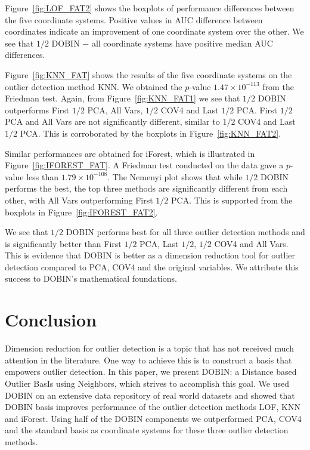 \documentclass[letter,12pt]{article}
\begin{document}
Figure~\ref{fig:LOF_FAT2} shows the boxplots of performance differences between the {\color{blue} five } coordinate systems. Positive values in AUC difference between coordinates  indicate an improvement of one coordinate system over the other. We see that $1/2$ DOBIN $-$ {\color{blue} all coordinate systems have positive median AUC differences}. 

Figure~\ref{fig:KNN_FAT} shows the results of the {\color{blue} five } coordinate systems on the outlier detection method KNN. We obtained the $p$-value $1.47\times 10^{-113}$ from the Friedman test. Again, from Figure~\ref{fig:KNN_FAT1} we see that $1/2$ DOBIN outperforms {\color{blue} First $1/2$ PCA,  All Vars, $1/2$ COV4 and Last $1/2$ PCA. First $1/2$ PCA and All Vars are not significantly different, similar to $1/2$ COV4 and Last $1/2$ PCA. }
This is corroborated by the boxplots in Figure~\ref{fig:KNN_FAT2}. %

Similar performances are obtained for iForest, which is illustrated in Figure~\ref{fig:IFOREST_FAT}. A Friedman test conducted on the data gave a $p$-value less than $1.79 \times 10^{-108}$. The Nemenyi plot shows that while $1/2$ DOBIN performs the best, {\color{blue} the top} three methods are significantly different from each other, with All Vars outperforming First $1/2$ PCA.  This is supported from the boxplots in Figure~\ref{fig:IFOREST_FAT2}. %

We see that $1/2$ DOBIN performs best for all three outlier detection methods and is significantly better than {\color{blue} First $1/2$ PCA, Last $1/2$, $1/2$ COV4} and All Vars. This is evidence that DOBIN is better as a dimension reduction tool for outlier detection compared to PCA, {\color{blue} COV4} and the original variables. We attribute this success to DOBIN's  mathematical foundations.



\section{Conclusion}
Dimension reduction for outlier detection is a topic that has not received much attention in the literature. One way to achieve this is to construct a basis that empowers outlier detection. In this paper, we present DOBIN: a Distance based Outlier BasIs using Neighbors, which strives to accomplish this goal. We used DOBIN on an extensive data repository of real world datasets and showed that DOBIN basis improves performance of the outlier detection methods LOF, KNN and iForest. Using half of the DOBIN components we outperformed PCA, {\color{blue} COV4}  and the standard basis as coordinate systems for these three outlier detection methods.
\end{document}
